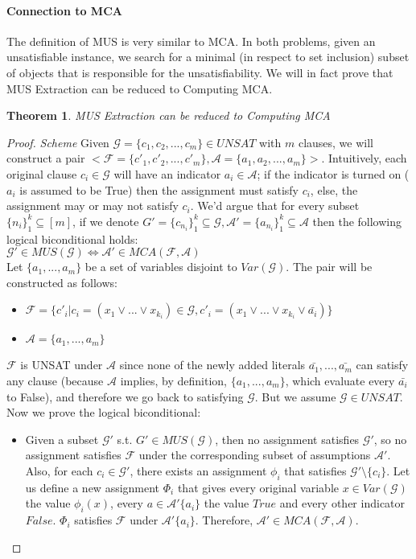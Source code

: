 \documentclass[]{article}
\newtheorem{theorem}{Theorem}
\begin{document}
	\paragraph{Connection to MCA} The definition of MUS is very similar to MCA. In both problems, given an unsatisfiable instance, we search for a minimal (in respect to set inclusion) subset of objects that is responsible for the unsatisfiability. We will in fact prove that MUS Extraction can be reduced to Computing MCA.
	
	\begin{theorem}
		MUS Extraction can be reduced to Computing MCA
	\end{theorem}
	\begin{proof} \textit{Scheme}
		Given $ \mathcal{G}=\{c_1,c_2,...,c_m\} \in UNSAT$ with $ m $ clauses, we will construct a pair  $ <\mathcal{F}=\{c'_1,c'_2,...,c'_m\},\mathcal{A}=\{a_1,a_2,...,a_m\}> $. Intuitively, each original clause $ c_i \in \mathcal{G} $ will have an indicator $ a_i \in \mathcal{A} $; if the indicator is turned on ($ a_i$ is assumed to be True) then the assignment must satisfy $ c_i $, else, the assignment may or may not satisfy $ c_i $. We'd argue that for every subset $\{n_i\}_1^k \subseteq [m] $, if we denote  ${G}'=\{c_{n_i}\}_1^k \subseteq \mathcal{G}, \mathcal{A}'=\{a_{n_i}\}_1^k \subseteq \mathcal{A}$ then the following logical biconditional holds: \\ 
		$ \mathcal{G}'\in MUS(\mathcal{G}) \iff  \mathcal{A}'\in MCA(\mathcal{F}, \mathcal{A}) $ \\
		Let $ \{a_1,...,a_m\} $ be a set of variables disjoint to $ Var(\mathcal{G}) $. The pair will be constructed as follows:
		\begin{itemize}
			\item $ \mathcal{F}=\{c'_i | c_i = (x_1 \lor ... \lor x_{k_i})\in\mathcal{G}, c'_i= (x_1 \lor ... \lor x_{k_i} \lor \bar{a_i}) \} $
			\item $ \mathcal{A}=\{a_1,...,a_m\} $
		\end{itemize}
	$ \mathcal{F} $ is UNSAT under $ \mathcal{A} $ since none of the newly added literals $ \bar{a_1},...,\bar{a_m} $ can satisfy any clause (because $ \mathcal{A} $ implies, by definition, $ \{a_1,...,a_m\} $, which evaluate every $ \bar{a_i} $ to False), and therefore we go back to satisfying $ \mathcal{G}$. But we assume $ \mathcal{G} \in UNSAT $. \\
	Now we prove the logical biconditional:
	\begin{itemize}
		\item Given a subset $ \mathcal{G}'$ s.t. $ {G}' \in MUS(\mathcal{G}) $, then no assignment satisfies $ \mathcal{G}' $, so no assignment satisfies $ \mathcal{F} $ under the corresponding subset of assumptions $ \mathcal{A}'$. Also, for each $ c_i \in \mathcal{G}'$, there exists an assignment $ \phi_i $ that satisfies $ \mathcal{G}' \setminus \{c_i\}$. Let us define a new assignment $ \Phi_i $ that gives every original variable $ x \in Var(\mathcal{G}) $ the value $ \phi_i(x) $, every $ a \in \mathcal{A}'\{a_i\}$ the value $ True $ and every other indicator $ False $. $ \Phi_i $ satisfies $ \mathcal{F} $ under $\mathcal{A}'\{a_i\}$. Therefore, $ \mathcal{A}' \in MCA(\mathcal{F,A}) $.

\end{itemize}
\end{proof}
\end{document}

